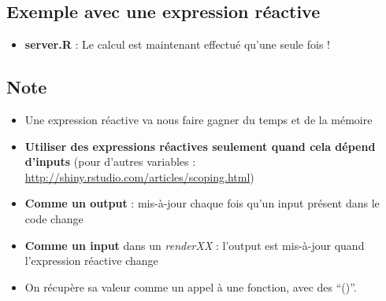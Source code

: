 \documentclass[]{article}
\newenvironment{Shaded}{\begin{snugshade}}{\end{snugshade}}
\newcommand{\KeywordTok}[1]{\textcolor[rgb]{0.13,0.29,0.53}{\textbf{#1}}}
\newcommand{\DataTypeTok}[1]{\textcolor[rgb]{0.13,0.29,0.53}{#1}}
\newcommand{\DecValTok}[1]{\textcolor[rgb]{0.00,0.00,0.81}{#1}}
\newcommand{\StringTok}[1]{\textcolor[rgb]{0.31,0.60,0.02}{#1}}
\newcommand{\OtherTok}[1]{\textcolor[rgb]{0.56,0.35,0.01}{#1}}
\newcommand{\OperatorTok}[1]{\textcolor[rgb]{0.81,0.36,0.00}{\textbf{#1}}}
\newcommand{\NormalTok}[1]{#1}
\providecommand{\tightlist}{%
  \setlength{\itemsep}{0pt}\setlength{\parskip}{0pt}}
\begin{document}
\subsection{Exemple avec une expression
réactive}\label{exemple-avec-une-expression-reactive}

\begin{itemize}
\tightlist
\item
  \textbf{server.R} : Le calcul est maintenant effectué qu'une seule
  fois !
\end{itemize}

\begin{Shaded}
\end{Shaded}

\subsection{Note}\label{note}

\begin{itemize}
\item
  Une expression réactive va nous faire gagner du temps et de la mémoire
\item
  \textbf{Utiliser des expressions réactives seulement quand cela dépend
  d'inputs} (pour d'autres variables :
  \url{http://shiny.rstudio.com/articles/scoping.html})
\item
  \textbf{Comme un output} : mis-à-jour chaque fois qu'un input présent
  dans le code change
\item
  \textbf{Comme un input} dans un \emph{renderXX} : l'output est
  mis-à-jour quand l'expression réactive change
\item
  On récupère sa valeur comme un appel à une fonction, avec des ``()''.
\end{itemize}
\end{document}
